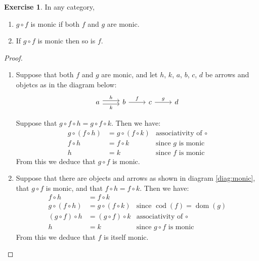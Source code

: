 \documentclass[10pt,a4paper,twoside]{article}
\DeclareMathOperator{\dom}{dom}
\DeclareMathOperator{\cod}{cod}
\theoremstyle{definition}
\newcounter{excounter}
\newtheorem{exercise}[excounter]{Exercise}
\begin{document}
\begin{exercise}

  In any category,
  \begin{enumerate}
  \item $g \circ f$ is monic if both $f$ and $g$ are monic.
  \item If $g \circ f$ is monic then so is $f$.
  \end{enumerate}

\end{exercise}

\begin{proof}\hfill

  \begin{enumerate}

  \item Suppose that both $f$ and $g$ are monic, and let $h$, $k$, $a$, $b$, $c$, $d$ be arrows and objetcs as in the diagram below:
    \begin{equation}\label{diag:monic}
      \begin{tikzcd}
        a \arrow[r, shift left, "h"] \arrow[r, shift right, "k" below]
        & b \arrow[r, "f"]
        & c \arrow[r, "g"]
        & d
      \end{tikzcd}
    \end{equation}

    Suppose that $g \circ f \circ h = g \circ f \circ k$. Then we have:
    \begin{align*}
      g \circ ( f \circ h ) &= g \circ ( f \circ k ) &\text{associativity of }\circ \\
                  f \circ h &= f \circ k             &\text{since $g$ is monic} \\
                          h &= k                     &\text{since $f$ is monic}
    \end{align*}
    From this we deduce that $g \circ f$ is monic.

  \item Suppose that there are objects and arrows as shown in diagram \ref{diag:monic}, that $g \circ f$ is monic, and that $f \circ h = f \circ k$. Then we have:
    \begin{align*}
      f \circ h             &= f \circ k \\
      g \circ ( f \circ h ) &= g \circ ( f \circ k ) &\text{since }\cod(f) = \dom(g) \\
      ( g \circ f ) \circ h &= ( g \circ f ) \circ k &\text{associativity of }\circ \\
                          h &= k                     &\text{since $g \circ f$ is monic}
    \end{align*}
    From this we deduce that $f$ is itself monic.

  \end{enumerate}

\end{proof}
\end{document}

